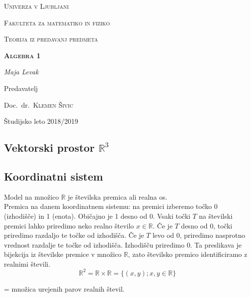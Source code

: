\documentclass[a4paper,12pt]{article}
\begin{document}
\begin{titlepage}
	\centering
	{\scshape\LARGE Univerza v Ljubljani \\}
	\vspace{10mm}
	{\scshape \normalsize Fakulteta za matematiko in fiziko\par}
	\vspace{40mm}
	{\scshape\large Teorija iz predavanj predmeta\par}
	\vspace{5mm}
	{\Huge\bfseries \textsc{Algebra 1} \par}
	\vspace{30mm}
	{\large\itshape Maja Levak\par}
	\vfill
	Predavatelj\par
	Doc.~dr.~\textsc{Klemen Šivic}

	\vfill

	{\normalsize{Študijsko leto 2018/2019} \par}
\end{titlepage}


\newpage
\tableofcontents
\newpage

\begin{center}
\section{Vektorski prostor $\mathbb{R}^3$}
\subsection{Koordinatni sistem}
\end{center}

Model na množico $\mathbb{R}$ je številska premica ali realna os. \\

Premica na danem koordinatnem sistemu: na premici izberemo točko 0 (izhodišče) in 1 (enota). Običajno je 1 desno od 0. Vsaki točki $T$ na številski premici lahko priredimo neko realno število $x \in \mathbb{R} $. Če je $T$ desno od 0, točki priredimo razdaljo te točke od izhodišča. Če je $T$ levo od 0, priredimo nasprotno vrednost razdalje te točke od izhodišča. Izhodišču priredimo 0. Ta preslikava je bijekcija iz številske premice v množico $\mathbb{R}$, zato številsko premico identificiramo z realnimi števili. \\
$$  \mathbb{R}^2 =  \mathbb{R} \times \mathbb{R} = \{ (x,y) ; x, y \in \mathbb{R} \}$$  

\begin{center}
= množica urejenih parov realnih števil. \\
\end{center}
\end{document}
